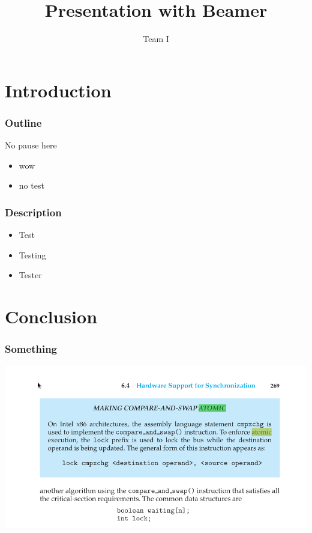 \documentclass{beamer}
\title{Presentation with Beamer}
\author{Team I}
\begin{document}
\maketitle

\section{Introduction} %

\begin{frame}
\frametitle{Outline}
    No pause here
    \begin{itemize}
        \item wow
        \item no test
    \end{itemize}
\end{frame}

\begin{frame}
    \frametitle{Description}
    \begin{itemize}
        \item Test \pause
        \item Testing \pause
        \item Tester 
    \end{itemize}
\end{frame}

\section{Conclusion}

\begin{frame}
    \frametitle{Something}
    \includegraphics[width=\linewidth]{1.png}
\end{frame}
\end{document}
